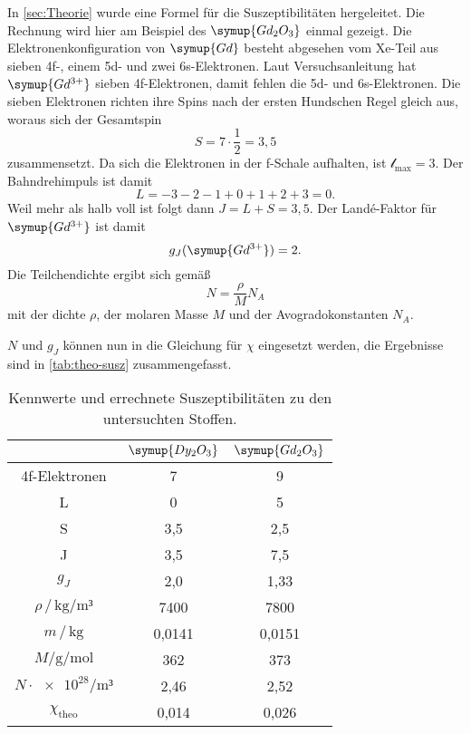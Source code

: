 In \autoref{sec:Theorie} wurde eine Formel für die Suszeptibilitäten hergeleitet. Die
Rechnung wird hier am Beispiel des $\symup{Gd_2O_3}$ einmal gezeigt. Die
Elektronenkonfiguration von $\symup{Gd}$ besteht abgesehen vom Xe-Teil aus sieben 4f-,
einem 5d- und zwei 6s-Elektronen.
Laut Versuchsanleitung hat $\symup{Gd^{3+}}$ sieben 4f-Elektronen, damit fehlen die 5d-
und 6s-Elektronen. Die sieben Elektronen richten ihre Spins nach der ersten Hundschen Regel gleich
aus, woraus sich der Gesamtspin
\[
	S = 7 \cdot \frac 12 = 3,5
\]
zusammensetzt. Da sich die Elektronen in der f-Schale aufhalten, ist
$\mathcal{l}_\text{max} = 3$. Der Bahndrehimpuls ist damit
\[
	L = -3 -2 -1 + 0 + 1 + 2 + 3 = 0.
\]
Weil mehr als halb voll ist folgt dann $J = L + S = 3,5$. Der Landé-Faktor für
$\symup{Gd^{3+}}$ ist damit
\[
	g_J(\symup{Gd^{3+}}) = 2.
\]
Die Teilchendichte ergibt sich gemäß
\[
	N = \frac{\rho}{M} N_A
\]
mit der dichte $\rho$, der molaren Masse $M$ und der Avogradokonstanten $N_A$.

$N$ und $g_J$ können nun in die Gleichung für $\chi$ eingesetzt werden, die Ergebnisse
sind in \autoref{tab:theo-susz} zusammengefasst.
\begin{table}
  \centering
  \caption{Kennwerte und errechnete Suszeptibilitäten zu den untersuchten Stoffen.}
  \label{tab:theo-susz}
  \begin{tabular}{c c c}
  \toprule
   & $\symup{Dy_2O_3}$	& $\symup{Gd_2O_3}$ \\
  \midrule
  4f-Elektronen                           & 7      & 9      \\
L                                         & 0      & 5      \\
S                                         & 3,5    & 2,5    \\
J                                         & 3,5    & 7,5    \\
$g_J$                                     & 2,0    & 1,33   \\
$\rho \, / \, \si{\kilo\gram\per\meter³}$ & 7400   & 7800   \\
$m \, / \, \si{\kilo\gram}$               & 0,0141 & 0,0151 \\
$M/\si{\gram\per\mol}$           	  & 362   & 373   \\
$N \cdot \num{e28}/\si{\meter³}$ 	  & 2,46  & 2,52  \\
$\chi_\text{theo}$               	  & 0,014 & 0,026 \\
  \bottomrule
  \end{tabular}
\end{table}

